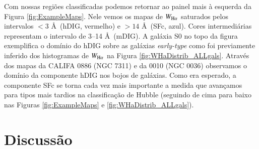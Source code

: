 Com nossas regiões classificadas podemos retornar ao painel mais à esquerda da Figura \ref{fig:ExampleMaps}. Nele vemos os mapas de $W_{\Ha}$ saturados pelos intervalos $< 3$ \AA\ (hDIG, vermelho) e $> 14$ \AA\ (SFc, azul). Cores intermediárias representam o intervalo de 3--14 \AA\ (mDIG). A galáxia S0 no topo da figura exemplifica o domínio do hDIG sobre as galáxias {\em early-type} como foi previamente inferido dos histogramas de $W_{\Ha}$ na Figura \ref{fig:WHaDistrib_ALLgals}. Através dos mapas da CALIFA 0886 (NGC 7311) e da 0010 (NGC 0036) observamos o domínio da componente hDIG nos bojos de galáxias. Como era esperado, a componente SFc se torna cada vez mais importante a medida que avançamos para tipos mais tardios na classificação de Hubble (seguindo de cima para baixo nas Figuras \ref{fig:ExampleMaps} e \ref{fig:WHaDistrib_ALLgals}).




\chapter{Discussão}
\label{sec:DIGdisc}

